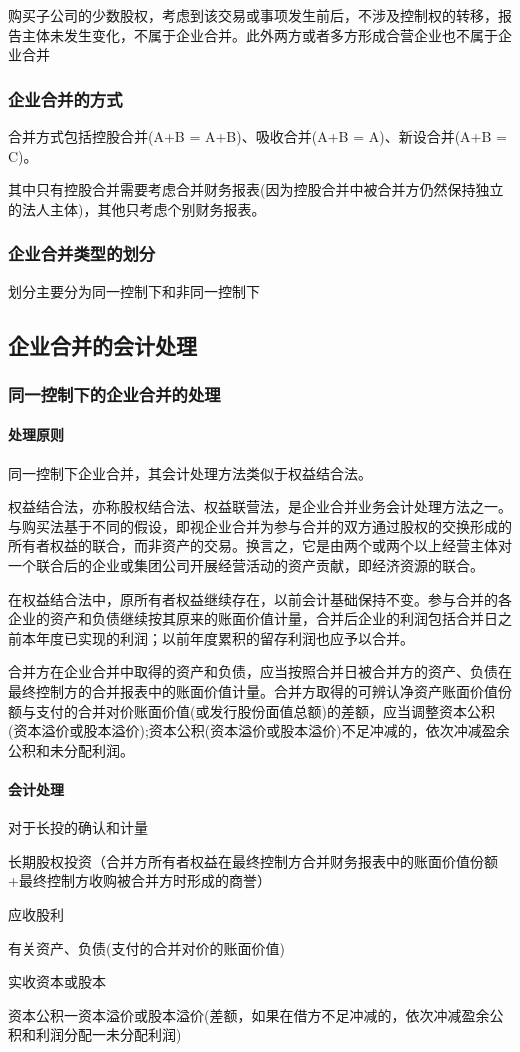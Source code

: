 \documentclass[UTF8,12pt]{ctexart}
\newenvironment{Dr}{%
	\begin{list}{}%
		{
			\setlength{\leftmargin}{2em}
			\setlength{\labelwidth}{2em}
			\setlength{\labelsep}{0pt}
			\setlength{\itemindent}{0pt}
			\setlength{\listparindent}{0pt}
			\setlength{\parsep}{0pt}
			\setlength{\topsep}{0pt}
		}
		\item[\textbf{借：}]
	}{%
	\end{list}
}
\newenvironment{Cr}{%
	\begin{list}{}%
		{
			\setlength{\leftmargin}{3em}
			\setlength{\labelwidth}{2em}
			\setlength{\labelsep}{0pt}
			\setlength{\itemindent}{0pt}
			\setlength{\listparindent}{0pt}
			\setlength{\parsep}{0pt}
			\setlength{\topsep}{0pt}
		}
		\item[\textbf{贷：}]
	}{%
	\end{list}
}
\numberwithin{equation}{section} %
\numberwithin{figure}{section}
\numberwithin{table}{section}
\begin{document}
	购买子公司的少数股权，考虑到该交易或事项发生前后，不涉及控制权的转移，报告主体未发生变化，不属于企业合并。此外两方或者多方形成合营企业也不属于企业合并
	\subsubsection{企业合并的方式}
	合并方式包括控股合并(A+B = A+B)、吸收合并(A+B = A)、新设合并(A+B = C)。
	
	其中只有控股合并需要考虑合并财务报表(因为控股合并中被合并方仍然保持独立的法人主体)，其他只考虑个别财务报表。
	
	\subsubsection{企业合并类型的划分}
	划分主要分为同一控制下和非同一控制下
	
	\subsection{企业合并的会计处理}
	\subsubsection{同一控制下的企业合并的处理}
	\paragraph{处理原则}
	同一控制下企业合并，其会计处理方法类似于权益结合法。
	
	权益结合法，亦称股权结合法、权益联营法，是企业合并业务会计处理方法之一。与购买法基于不同的假设，即视企业合并为参与合并的双方通过股权的交换形成的所有者权益的联合，而非资产的交易。换言之，它是由两个或两个以上经营主体对一个联合后的企业或集团公司开展经营活动的资产贡献，即经济资源的联合。
	
	在权益结合法中，原所有者权益继续存在，以前会计基础保持不变。参与合并的各企业的资产和负债继续按其原来的账面价值计量，合并后企业的利润包括合并日之前本年度已实现的利润；以前年度累积的留存利润也应予以合并。
	
	合并方在企业合并中取得的资产和负债，应当按照合并日被合并方的资产、负债在最终控制方的合并报表中的账面价值计量。合并方取得的可辨认净资产账面价值份额与支付的合并对价账面价值(或发行股份面值总额)的差额，应当调整资本公积(资本溢价或股本溢价);资本公积(资本溢价或股本溢价)不足冲减的，依次冲减盈余公积和未分配利润。
	
	\paragraph{会计处理}
	对于长投的确认和计量
	\begin{Dr}
		长期股权投资（合并方所有者权益在最终控制方合并财务报表中的账面价值份额+最终控制方收购被合并方时形成的商誉）
		
		应收股利
	\end{Dr}
	\begin{Cr}
		有关资产、负债(支付的合并对价的账面价值)
		
		实收资本或股本
		
		资本公积一资本溢价或股本溢价(差额，如果在借方不足冲减的，依次冲减盈余公积和利润分配一未分配利润)
	\end{Cr}
	
\end{document}
